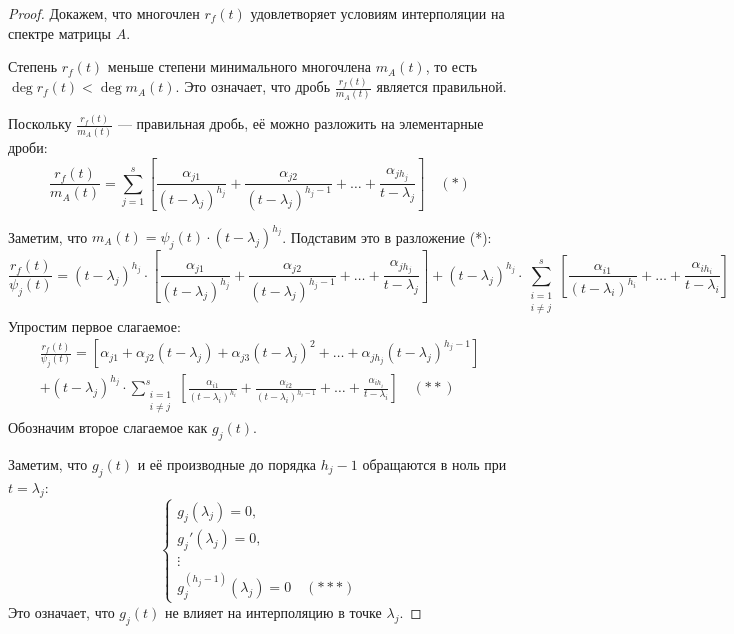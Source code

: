 \begin{proof}
\leavevmode \nl 

    Докажем, что многочлен \( r_f(t) \) удовлетворяет условиям интерполяции на спектре матрицы \( A \).

       Степень \( r_f(t) \) меньше степени минимального многочлена \( m_A(t) \), то есть \\\( \deg r_f(t) < \deg m_A(t) \). Это означает, что дробь \( \frac{r_f(t)}{m_A(t)} \) является правильной.

       Поскольку \( \frac{r_f(t)}{m_A(t)} \) — правильная дробь, её можно разложить на элементарные дроби:
       \[
       \frac{r_f(t)}{m_A(t)} = \sum_{j=1}^{s} \left[ \frac{\alpha_{j1}}{(t - \lambda_j)^{h_j}} + \frac{\alpha_{j2}}{(t - \lambda_j)^{h_j - 1}} + \ldots + \frac{\alpha_{j h_j}}{t - \lambda_j} \right] \quad (*)
       \]

       Заметим, что \( m_A(t) = \psi_j(t) \cdot (t - \lambda_j)^{h_j} \). Подставим это в разложение (*):
       \[
       \frac{r_f(t)}{\psi_j(t)} = (t - \lambda_j)^{h_j} \cdot \left[ \frac{\alpha_{j1}}{(t - \lambda_j)^{h_j}} + \frac{\alpha_{j2}}{(t - \lambda_j)^{h_j - 1}} + \ldots + \frac{\alpha_{j h_j}}{t - \lambda_j} \right] + (t - \lambda_j)^{h_j} \cdot \sum_{\substack{i=1 \\ i \neq j}}^{s} \left[ \frac{\alpha_{i1}}{(t - \lambda_i)^{h_i}} + \ldots + \frac{\alpha_{i h_i}}{t - \lambda_i} \right]
       \]
      Упростим первое слагаемое:
        \begin{multline*}
        \frac{r_f(t)}{\psi_j(t)} = \left[ \alpha_{j1} + \alpha_{j2} (t - \lambda_j) + \alpha_{j3} (t - \lambda_j)^2 + \ldots + \alpha_{j h_j} (t - \lambda_j)^{h_j - 1} \right] \\
        + (t - \lambda_j)^{h_j} \cdot \sum_{\substack{i=1 \\ i \neq j}}^{s} \left[ \frac{\alpha_{i1}}{(t - \lambda_i)^{h_i}} + \frac{\alpha_{i2}}{(t - \lambda_i)^{h_i - 1}} + \ldots + \frac{\alpha_{i h_i}}{t - \lambda_i} \right] \quad (**)
        \end{multline*}
       Обозначим второе слагаемое как \( g_j(t) \).

       Заметим, что \( g_j(t) \) и её производные до порядка \( h_j - 1 \) обращаются в ноль при \( t = \lambda_j \):
       \[
       \begin{cases}
           g_j(\lambda_j) = 0, \\
           g_j'(\lambda_j) = 0, \\
           \vdots \\
           g_j^{(h_j - 1)}(\lambda_j) = 0 \quad (***)
       \end{cases}
       \]
       Это означает, что \( g_j(t) \) не влияет на интерполяцию в точке \( \lambda_j \).



\end{proof}
